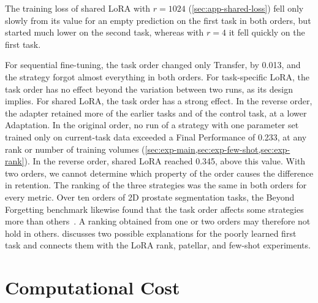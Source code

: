The training loss of shared LoRA with $r = 1024$ (\cref{sec:app-shared-loss}) fell only slowly from its value for an empty prediction on the first task in both orders, but started much lower on the second task, whereas with $r = 4$ it fell quickly on the first task.

For sequential fine-tuning, the task order changed only Transfer, by 0.013, and the strategy forgot almost everything in both orders.
For task-specific LoRA, the task order has no effect beyond the variation between two runs, as its design implies.
For shared LoRA, the task order has a strong effect.
In the reverse order, the adapter retained more of the earlier tasks and of the control task, at a lower Adaptation.
In the original order, no run of a strategy with one parameter set trained only on current-task data exceeded a Final Performance of 0.233, at any rank or number of training volumes (\cref{sec:exp-main,sec:exp-few-shot,sec:exp-rank}).
In the reverse order, shared LoRA reached 0.345, above this value.
With two orders, we cannot determine which property of the order causes the difference in retention.
The ranking of the three strategies was the same in both orders for every metric.
Over ten orders of 2D prostate segmentation tasks, the Beyond Forgetting benchmark likewise found that the task order affects some strategies more than others~\cite[Sec.~4.4]{wang2026beyondforgetting}.
A ranking obtained from one or two orders may therefore not hold in others.
 discusses two possible explanations for the poorly learned first task and connects them with the LoRA rank, patellar, and few-shot experiments.

\section{Computational Cost}
\label{sec:exp-compute}

